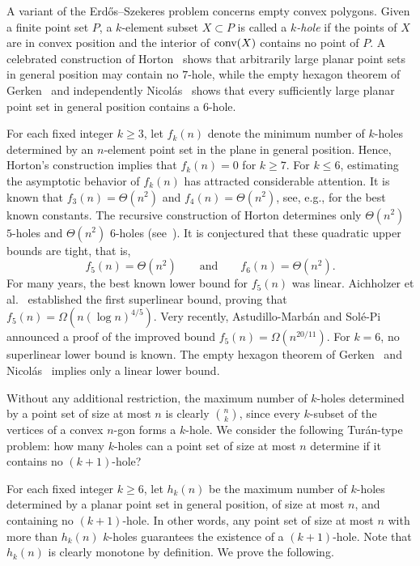 \documentclass[11pt]{article}
\theoremstyle{plain}
\theoremstyle{definition}
\theoremstyle{remark}
\def\conv{\mbox{\rm conv}}
\begin{document}
A variant of the Erd\H{o}s--Szekeres problem concerns empty convex polygons. Given a finite point set \(P\), a \(k\)-element subset \(X\subset P\) is called a \emph{\(k\)-hole} if the points of \(X\) are in convex position and the interior of \(\conv(X)\) contains no point of \(P\). A celebrated construction of Horton~\cite{H} shows that arbitrarily large planar point sets in general position may contain no \(7\)-hole, while the empty hexagon theorem of Gerken~\cite{Gerken} and independently Nicol\'as~\cite{Nicolas} shows that every sufficiently large planar point set in general position contains a \(6\)-hole. 



For each fixed integer $k \ge 3$, let $f_k(n)$ denote the minimum number of
$k$-holes determined by an $n$-element point set in the plane in general
position. Hence, Horton's construction implies that $f_k(n)=0$ for $k \ge 7$.
For $k \le 6$, estimating the asymptotic behavior of $f_k(n)$ has attracted
considerable attention. It is known that $f_3(n)=\Theta(n^2)$ and
$f_4(n)=\Theta(n^2)$, see, e.g., \cite{BV,Ai} for the best known constants.
The recursive construction of Horton determines only \(\Theta(n^2)\)
\(5\)-holes and \(\Theta(n^2)\) \(6\)-holes (see~\cite{BV}). It is conjectured that these
quadratic upper bounds are tight, that is,
\[
        f_5(n)=\Theta(n^2)
        \qquad\text{and}\qquad
        f_6(n)=\Theta(n^2).
\]
For many years, the best known lower bound for \(f_5(n)\) was linear.
Aichholzer et al.~\cite{AiB} established the first superlinear bound, proving
that \(f_5(n)=\Omega(n(\log n)^{4/5})\). Very recently,
Astudillo-Marb\'an and Sol\'e-Pi~\cite{AMS} announced a proof of the improved
bound \(f_5(n)=\Omega(n^{20/11})\). For \(k=6\), no superlinear lower bound is known.  The empty hexagon theorem
of Gerken~\cite{Gerken} and Nicol\'as~\cite{Nicolas} implies only a linear
lower bound.




Without any additional restriction, the maximum number of \(k\)-holes determined
by a point set of size at most \(n\) is clearly \(\binom{n}{k}\), since every
\(k\)-subset of the vertices of a convex \(n\)-gon forms a \(k\)-hole.  We
consider the following Tur\'an-type problem: how many \(k\)-holes can a point
set of size at most \(n\) determine if it contains no \((k+1)\)-hole?  

For each fixed integer \(k\ge 6\), let \(h_k(n)\) be the maximum number of
\(k\)-holes determined by a planar point set in general position, of size at
most \(n\), and containing no \((k+1)\)-hole.  In other words, any point set of size at most \(n\) with more than \(h_k(n)\)
\(k\)-holes guarantees the existence of a \((k+1)\)-hole. Note that $h_k(n)$ is clearly monotone by definition. We prove the following.
\end{document}

